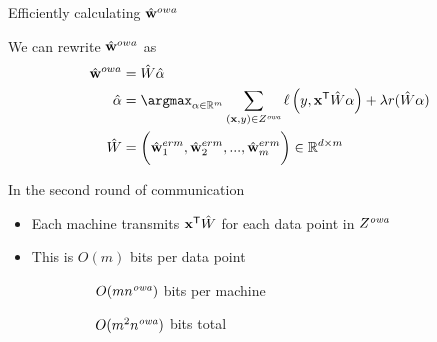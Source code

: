 \begin{frame}
\begin{center}
\end{center}

\end{frame}


\begin{frame}{Efficiently calculating $\hat{\mathbf w}^{owa}$}

%

\vspace{0.1in}
We can rewrite $\hat{\mathbf w}^{owa}$ as
\begin{align}
\wowa &= \matW \ahat
\\
\label{eq:afull}
\ahat &= \argmax_{\alpha\in\mathbb R^m} \sum _{(\x,y)\in \Zowa} \loss\left(y,\trans\x \matW \alpha \right)
+
\lambda \reg(\matW\alpha)
\\
\matW &= \bigg(\wmle_1, \wmle_2, ..., \wmle_m\bigg) \in \mathbb R^{d\times m}
\end{align}

In the second round of communication
\begin{itemize}
\item Each machine transmits ${\mathbf{x}}^{\mathsf{T}}\hat W$ for each data point in $Z^{\textit{owa}}$
\item This is $O(m)$ bits per data point 

~~~~~~~~~$O(mn^{\textit{owa}})$ bits per machine

~~~~~~~~~$O(m^2n^{\textit{owa}})$ bits total
\end{itemize}

\end{frame}

